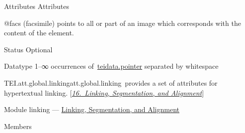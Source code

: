 \begin{reflist}
    \item[{Attributes}]
  Attributes\hfil\\[-10pt]\begin{sansreflist}
    \item[@facs]
  (facsimile) points to all or part of an image which corresponds with the content of the element.
\begin{reflist}
    \item[{Status}]
  Optional
    \item[{Datatype}]
  1–∞ occurrences of \hyperref[TEI.teidata.pointer]{teidata.pointer} separated by whitespace
\end{reflist}  
\end{sansreflist}  
\end{reflist}  
\begin{reflist}
\item[]\begin{specHead}{TEI.att.global.linking}{att.global.linking} provides a set of attributes for hypertextual linking. [\textit{\hyperref[SA]{16.\ Linking, Segmentation, and Alignment}}]\end{specHead} 
    \item[{Module}]
  linking — \hyperref[SA]{Linking, Segmentation, and Alignment}
    \item[{Members}]

\end{reflist}
